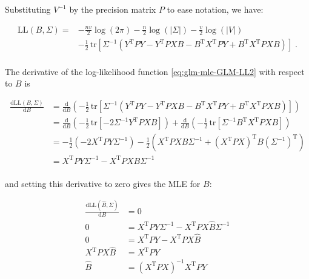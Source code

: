 \documentclass[a4paper,12pt,twoside]{book}
\begin{document}
Substituting $V^{-1}$ by the precision matrix $P$ to ease notation, we have:

\begin{equation} \label{eq:glm-mle-GLM-LL2}
\begin{split}
\mathrm{LL}(B,\Sigma) = &- \frac{nv}{2} \log(2\pi) - \frac{n}{2} \log(|\Sigma|) - \frac{v}{2} \log(|V|) \\
&- \frac{1}{2} \, \mathrm{tr}\left[ \Sigma^{-1} \left( Y^\mathrm{T} P Y - Y^\mathrm{T} P X B - B^\mathrm{T} X^\mathrm{T} P Y + B^\mathrm{T} X^\mathrm{T} P X B \right) \right] \; .\\
\end{split}
\end{equation}

\vspace{1em}
The derivative of the log-likelihood function \eqref{eq:glm-mle-GLM-LL2} with respect to $B$ is

\begin{equation} \label{eq:glm-mle-dLL-dB}
\begin{split}
\frac{\mathrm{d}\mathrm{LL}(B,\Sigma)}{\mathrm{d}B} &= \frac{\mathrm{d}}{\mathrm{d}B} \left( - \frac{1}{2} \, \mathrm{tr}\left[ \Sigma^{-1} \left( Y^\mathrm{T} P Y - Y^\mathrm{T} P X B - B^\mathrm{T} X^\mathrm{T} P Y + B^\mathrm{T} X^\mathrm{T} P X B \right) \right] \right) \\
&= \frac{\mathrm{d}}{\mathrm{d}B} \left( -\frac{1}{2} \, \mathrm{tr}\left[ -2 \Sigma^{-1} Y^\mathrm{T} P X B \right] \right) + \frac{\mathrm{d}}{\mathrm{d}B} \left( -\frac{1}{2} \, \mathrm{tr}\left[ \Sigma^{-1} B^\mathrm{T} X^\mathrm{T} P X B \right] \right) \\
&= - \frac{1}{2} \left( -2 X^\mathrm{T} P Y \Sigma^{-1} \right) - \frac{1}{2} \left( X^\mathrm{T} P X B \Sigma^{-1} + (X^\mathrm{T} P X)^\mathrm{T} B (\Sigma^{-1})^\mathrm{T} \right) \\
&= X^\mathrm{T} P Y \Sigma^{-1} - X^\mathrm{T} P X B \Sigma^{-1} \\
\end{split}
\end{equation}

and setting this derivative to zero gives the MLE for $B$:

\begin{equation} \label{eq:glm-mle-B-MLE}
\begin{split}
\frac{\mathrm{d}\mathrm{LL}(\hat{B},\Sigma)}{\mathrm{d}B} &= 0 \\
0 &= X^\mathrm{T} P Y \Sigma^{-1} - X^\mathrm{T} P X \hat{B} \Sigma^{-1} \\
0 &= X^\mathrm{T} P Y - X^\mathrm{T} P X \hat{B} \\
X^\mathrm{T} P X \hat{B} &= X^\mathrm{T} P Y \\
\hat{B} &= \left( X^\mathrm{T} P X \right)^{-1} X^\mathrm{T} P Y \\
\end{split}
\end{equation}
\end{document}

